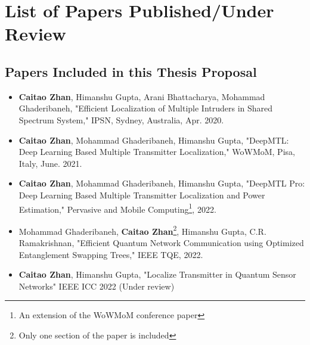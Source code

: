 \chapter{List of Papers Published/Under Review}

\section*{Papers Included in this Thesis Proposal}
\begin{itemize}
    \item \textbf{Caitao Zhan}, Himanshu Gupta, Arani Bhattacharya, Mohammad Ghaderibaneh, "Efficient Localization of Multiple Intruders in Shared Spectrum System," IPSN, Sydney, Australia, Apr. 2020.

    \item \textbf{Caitao Zhan}, Mohammad Ghaderibaneh, Himanshu Gupta, "DeepMTL: Deep Learning Based Multiple Transmitter Localization," WoWMoM, Pisa, Italy, June. 2021. 

    \item \textbf{Caitao Zhan}, Mohammad Ghaderibaneh, Himanshu Gupta, "DeepMTL Pro: Deep Learning Based Multiple Transmitter Localization and Power Estimation," Pervasive and Mobile Computing\footnote{An extension of the WoWMoM conference paper}, 2022.

    \item Mohammad Ghaderibaneh, \textbf{Caitao Zhan}\footnote{Only one section of the paper is included}, Himanshu Gupta, C.R. Ramakrishnan, "Efficient Quantum Network Communication using Optimized Entanglement Swapping Trees," IEEE TQE, 2022.

    \item \textbf{Caitao Zhan}, Himanshu Gupta, "Localize Transmitter in Quantum Sensor Networks" IEEE ICC 2022 (Under review)

\end{itemize}

